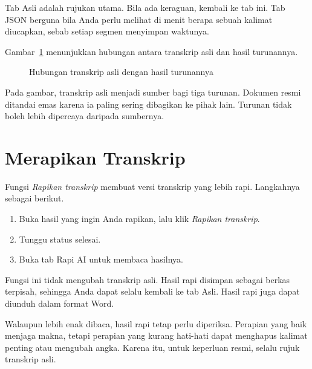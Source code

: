 Tab Asli adalah rujukan utama. Bila ada keraguan, kembali ke tab ini. Tab JSON berguna bila Anda perlu melihat di menit berapa sebuah kalimat diucapkan, sebab setiap segmen menyimpan waktunya.

Gambar~\ref{fig:turunan} menunjukkan hubungan antara transkrip asli dan hasil turunannya.

\begin{figure}[H]
\centering
{}
\caption{Hubungan transkrip asli dengan hasil turunannya}
\label{fig:turunan}
\end{figure}

Pada gambar, transkrip asli menjadi sumber bagi tiga turunan. Dokumen resmi ditandai emas karena ia paling sering dibagikan ke pihak lain. Turunan tidak boleh lebih dipercaya daripada sumbernya.

\section{Merapikan Transkrip}
Fungsi \emph{Rapikan transkrip} membuat versi transkrip yang lebih rapi. Langkahnya sebagai berikut.
\begin{enumerate}
  \item Buka hasil yang ingin Anda rapikan, lalu klik \emph{Rapikan transkrip}.
  \item Tunggu status selesai.
  \item Buka tab Rapi AI untuk membaca hasilnya.
\end{enumerate}

Fungsi ini tidak mengubah transkrip asli. Hasil rapi disimpan sebagai berkas terpisah, sehingga Anda dapat selalu kembali ke tab Asli. Hasil rapi juga dapat diunduh dalam format Word.

Walaupun lebih enak dibaca, hasil rapi tetap perlu diperiksa. Perapian yang baik menjaga makna, tetapi perapian yang kurang hati-hati dapat menghapus kalimat penting atau mengubah angka. Karena itu, untuk keperluan resmi, selalu rujuk transkrip asli.

